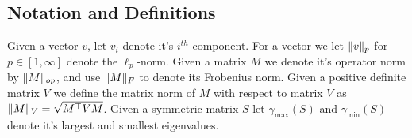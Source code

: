 \subsection{Notation and Definitions}
Given a vector $v$, let $v_i$ denote it's $i^{th}$ component. For a vector we let $\lVert v \rVert_{p}$ for $p\in [1,\infty]$ denote the $\ell_p$-norm. Given a matrix $M$ we denote it's operator norm by $\lVert M \rVert_{op}$, and use $\lVert M \rVert_{F}$ to denote its Frobenius norm. Given a positive definite matrix $V$ we define the matrix norm of $M$ with respect to matrix $V$ as $\lVert M \rVert_V = \sqrt{M^{\top}V M}$. Given a symmetric matrix $S$ let $\gamma_{\max}(S)$ and $\gamma_{\min}(S)$ denote it's largest and smallest eigenvalues.


  